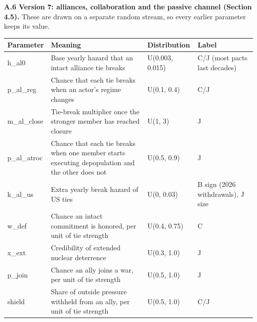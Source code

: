 \documentclass[
  10pt,
]{article}
\newcounter{none} %
\begin{document}
\textbf{A.6 Version 7: alliances, collaboration and the passive channel (Section 4.5).} These are
drawn on a separate random stream, so every earlier parameter keeps its value.

{\def\LTcaptype{none} %
\begin{longtable}[]{@{}
  >{\raggedright\arraybackslash}p{}
  >{\raggedright\arraybackslash}p{}
  >{\raggedright\arraybackslash}p{}
  >{\raggedright\arraybackslash}p{}@{}}
\toprule\noalign{}
\begin{minipage}[b]{\linewidth}\raggedright
Parameter
\end{minipage} & \begin{minipage}[b]{\linewidth}\raggedright
Meaning
\end{minipage} & \begin{minipage}[b]{\linewidth}\raggedright
Distribution
\end{minipage} & \begin{minipage}[b]{\linewidth}\raggedright
Label
\end{minipage} \\
\midrule\noalign{}
\endhead
\bottomrule\noalign{}
\endlastfoot
h\_al0 & Base yearly hazard that an intact alliance tie breaks & U(0.003, 0.015) & C/J (most pacts
last decades) \\
p\_al\_reg & Chance that each tie breaks when an actor's regime changes & U(0.1, 0.4) & C/J \\
m\_al\_close & Tie-break multiplier once the stronger member has reached closure & U(1, 3) & J \\
p\_al\_atroc & Chance that each tie breaks when one member starts executing depopulation and the
other does not & U(0.5, 0.9) & J \\
k\_al\_us & Extra yearly break hazard of US ties & U(0, 0.03) & B sign (2026 withdrawals), J size \\
w\_def & Chance an intact commitment is honored, per unit of tie strength & U(0.4, 0.75) & C \\
x\_ext & Credibility of extended nuclear deterrence & U(0.3, 1.0) & J \\
p\_join & Chance an ally joins a war, per unit of tie strength & U(0.5, 1.0) & J \\
shield & Share of outside pressure withheld from an ally, per unit of tie strength & U(0.5, 1.0) &
C/J \\

\end{longtable}}
\end{document}
